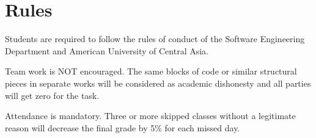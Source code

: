 \documentclass[12pt,a4paper,oneside]{article}
\begin{document}
    \section{Rules}

        Students are required to follow the rules of conduct of the Software
        Engineering Department and American University of Central Asia.

        Team work is NOT encouraged. The same blocks of code or similar
        structural pieces in separate works will be considered as academic
        dishonesty and all parties will get zero for the task.

        Attendance is mandatory. Three or more skipped classes without a
        legitimate reason will decrease the final grade by 5\% for each missed
        day.
\end{document}
